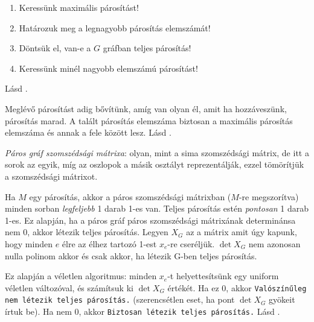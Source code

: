 \documentclass[%
	DIV=15,appendixprefix]{scrreprt}
\theoremstyle{definition}
\theoremstyle{remark}
\begin{document}
\begin{enumerate}
	\item Keressünk maximális párosítást!
	\item Határozuk meg a legnagyobb párosítás elemszámát!
	\item\label{itm:vanpar} Döntsük el, van-e a $G$ gráfban teljes párosítás!
	\item\label{itm:parkeres} Keressünk minél nagyobb elemszámú párosítást!
\end{enumerate}
%
Lásd
\cite[\href{http://www.math.u-szeged.hu/~hajnal/courses/MSc_Diszkret/MSc_kombi13/ea-parositasok.pdf}
{\emph{Párosítások I. -- Alapok, nem kombinatorikus módszerek}}, 2.~szakasz]{DiMat}.

Meglévő párosítást adig bővítünk, amíg van olyan él, amit ha hozzáveszünk, párosítás marad. A talált
párosítás elemszáma biztosan a maximális párosítás elemszáma és annak a fele között lesz.
%
Lásd
\cite[\href{http://www.math.u-szeged.hu/~hajnal/courses/MSc_Diszkret/MSc_kombi13/ea-parositasok.pdf}
{\emph{Párosítások I. -- Alapok, nem kombinatorikus módszerek}}, 3.~szakasz]{DiMat}.

\emph{Páros gráf szomszédsági mátrixa}: olyan, mint a sima szomszédsági mátrix, de itt a sorok az
egyik, míg az oszlopok a másik osztályt reprezentálják, ezzel tömörítjük a szomszédsági mátrixot.

Ha $M$ egy párosítás, akkor a páros szomszédsági mátrixban ($ M $-re megszorítva) minden sorban
\emph{legfeljebb} 1 darab 1-es van. Teljes párosítás estén \emph{pontosan} 1 darab 1-es. Ez alapján,
ha a páros gráf páros szomszédsági mátrixának determinánsa nem 0, akkor létezik teljes
párosítás.
%
Legyen $X_G$ az a mátrix amit úgy kapunk, hogy minden $e$ élre az élhez tartozó 1-est $x_e$-re
cseréljük. $ \det X_G $ nem azonosan nulla polinom akkor és csak akkor, ha létezik G-ben teljes
párosítás.

Ez alapján a véletlen algoritmus: minden $x_e$-t helyettesítsünk egy uniform véletlen változóval, és
számítsuk ki $ \det X_G $ értékét. Ha ez 0, akkor \texttt{Valószínűleg nem létezik teljes
párosítás.} (szerencsétlen eset, ha pont $ \det X_G $ gyökeit írtuk be). Ha nem 0, akkor
\texttt{Biztosan létezik teljes párosítás.}
%
Lásd
\cite[\href{http://www.math.u-szeged.hu/~hajnal/courses/MSc_Diszkret/MSc_kombi13/ea-Edmonds.pdf}
{\emph{Párosítások II. -- Kombinatorikus módszerek}}]{DiMat}.
\end{document}
